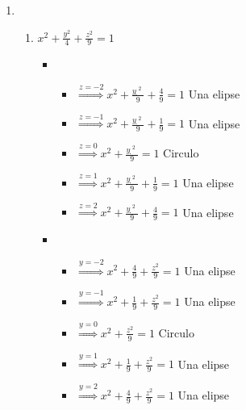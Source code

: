 \documentclass[../practica_02.tex]{subfiles}
\begin{document}
    \begin{enumerate}
        \item
            \begin{enumerate}
                \item $x^2 + \frac{y^2}{4} + \frac{z^2}{9} = 1$

                    \begin{itemize}
                        \item
                            \begin{itemize}
                                \item $\stackrel{z=-2}{\Rightarrow} x^2 + \frac{ỵ^2}{9} + \frac{4}{9} = 1$ Una elipse
                                \item $\stackrel{z=-1}{\Rightarrow} x^2 + \frac{ỵ^2}{9} + \frac{1}{9} = 1$ Una elipse
                                \item $\stackrel{z=0}{\Rightarrow} x^2 + \frac{ỵ^2}{9} = 1$ Circulo
                                \item $\stackrel{z=1}{\Rightarrow} x^2 + \frac{ỵ^2}{9} + \frac{1}{9} = 1$ Una elipse
                                \item $\stackrel{z=2}{\Rightarrow} x^2 + \frac{ỵ^2}{9} + \frac{4}{9} = 1$ Una elipse
                            \end{itemize}

                        \item
                            \begin{itemize}
                                \item $\stackrel{y=-2}{\Rightarrow} x^2 + \frac{4}{9} + \frac{z^2}{9} = 1$ Una elipse
                                \item $\stackrel{y=-1}{\Rightarrow} x^2 + \frac{1}{9} + \frac{z^2}{9} = 1$ Una elipse
                                \item $\stackrel{y=0}{\Rightarrow} x^2 + \frac{z^2}{9} = 1$ Circulo
                                \item $\stackrel{y=1}{\Rightarrow} x^2 + \frac{1}{9} + \frac{z^2}{9} = 1$ Una elipse
                                \item $\stackrel{y=2}{\Rightarrow} x^2 + \frac{4}{9} + \frac{z^2}{9} = 1$ Una elipse
                            \end{itemize}


\end{itemize}
\end{enumerate}
\end{enumerate}
\end{document}
